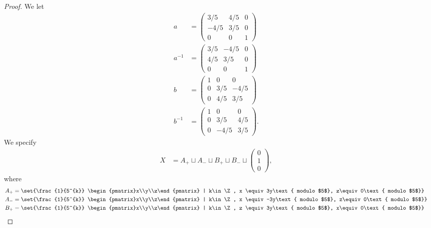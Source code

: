 \documentclass[10pt]{mypackage2}
\begin{document}
\begin{proof}
  We let
  \begin{align*}
    a &= \begin{pmatrix}3/5 & 4/5 & 0 \\ -4/5 & 3/5 & 0 \\ 0 & 0 & 1\end{pmatrix}\\
    a^{-1} &= \begin{pmatrix}3/5 & -4/5 & 0 \\ 4/5 & 3/5 & 0 \\ 0 & 0 & 1\end{pmatrix}\\
    b &= \begin{pmatrix}1 & 0 & 0 \\ 0 & 3/5 & -4/5 \\ 0 & 4/5 & 3/5\end{pmatrix}\\
    b^{-1} &= \begin{pmatrix}1 & 0 & 0 \\ 0 & 3/5 & 4/5 \\ 0 & -4/5 & 3/5\end{pmatrix}.
  \end{align*}
  We specify
  \begin{align*}
    X &= A_{+} \sqcup A_{-} \sqcup B_{+} \sqcup B_{-} \sqcup \begin{pmatrix}0\\1\\0\end{pmatrix},
  \end{align*}
  where
  \begin{align*}
    A_{+} &= \set{\frac{1}{5^{k}} \begin{pmatrix}x\\y\\z\end{pmatrix} | k\in \Z, x \equiv 3y\text{ modulo $5$}, z\equiv0\text{ modulo $5$}}\\
    A_{-} &= \set{\frac{1}{5^{k}} \begin{pmatrix}x\\y\\z\end{pmatrix} | k\in \Z, x \equiv -3y\text{ modulo $5$}, z\equiv 0\text{ modulo $5$}}\\
    B_{+} &= \set{\frac{1}{5^{k}} \begin{pmatrix}x\\y\\z\end{pmatrix} | k\in \Z, z \equiv 3y\text{ modulo $5$}, x\equiv 0\text{ modulo $5$}}\\

\end{align*}
\end{proof}
\end{document}
